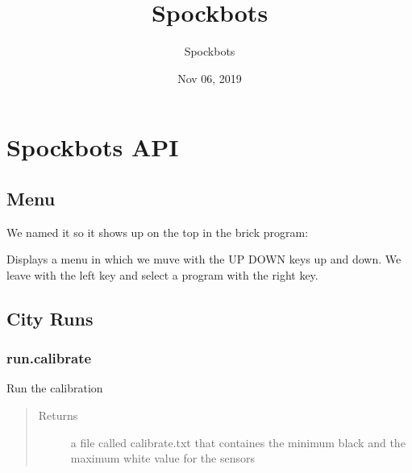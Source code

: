 \documentclass[letterpaper,10pt,english]{sphinxmanual}
\title{Spockbots}
\date{Nov 06, 2019}
\author{Spockbots}
\begin{document}
\pagestyle{empty}
\sphinxmaketitle
\pagestyle{plain}
\sphinxtableofcontents
\pagestyle{normal}
\label{\detokenize{index::doc}}



\chapter{Spockbots API}
\label{\detokenize{index:spockbots-api}}

\section{Menu}
\label{\detokenize{0_menu:menu}}\label{\detokenize{0_menu::doc}}
We named it  so it shows up on the top in the brick program:

\begin{sphinxVerbatim}[commandchars=\\\{\}]
  
\end{sphinxVerbatim}

Displays a menu in which we muve with the UP DOWN keys up and down. We leave with the left
key and select a program with the right key.


\section{City Runs}
\label{\detokenize{run:city-runs}}\label{\detokenize{run::doc}}

\subsection{run.calibrate}
\label{\detokenize{run:module-run.calibrate}}\label{\detokenize{run:run-calibrate}}

\begin{fulllineitems}
\label{\detokenize{run:run.calibrate.run_calibrate}}
Run the calibration
\begin{quote}\begin{description}
\item[{Returns}] \leavevmode
a file called calibrate.txt that containes the minimum black and the maximum white value for the sensors

\end{description}\end{quote}

\end{fulllineitems}
\end{document}
